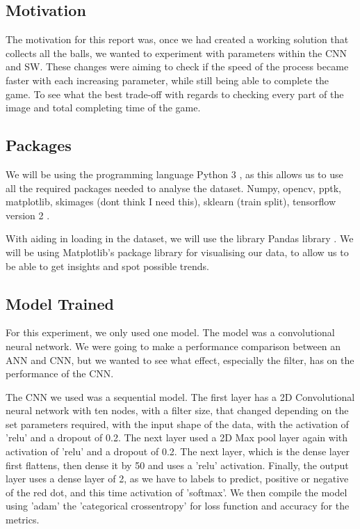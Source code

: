 \documentclass[a4paper,10pt]{article}
\begin{document}
\subsection{Motivation}

The motivation for this report was, once we had created a working solution that collects all the balls, we wanted to experiment with parameters within the CNN and SW. These changes were aiming to check if the speed of the process became faster with each increasing parameter, while still being able to complete the game. To see what the best trade-off with regards to checking every part of the image and total completing time of the game.

\subsection{Packages}
We will be using the programming language Python 3 \cite{Python}, as this allows us to use all the required packages needed to analyse the dataset. Numpy, opencv, pptk, matplotlib, skimages (dont think I need this), sklearn (train split), tensorflow version 2 \cite{tensorflow2015-whitepaper}.

With aiding in loading in the dataset, we will use the library Pandas library \cite{mckinney-proc-scipy-2010}. We will be using Matplotlib's \cite{hunter2007matplotlib} package library for visualising our data, to allow us to be able to get insights and spot possible trends.


\subsection{Model Trained}
For this experiment, we only used one model. The model was a convolutional neural network. We were going to make a performance comparison between an ANN and CNN, but we wanted to see what effect, especially the filter, has on the performance of the CNN. 

The CNN we used was a sequential model. The first layer has a 2D Convolutional neural network with ten nodes, with a filter size, that changed depending on the set parameters required, with the input shape of the data, with the activation of 'relu' and a dropout of 0.2. The next layer used a 2D Max pool layer again with activation of 'relu' and a dropout of 0.2. The next layer, which is the dense layer first flattens, then dense it by 50 and uses a 'relu' activation. Finally, the output layer uses a dense layer of 2, as we have to labels to predict, positive or negative of the red dot, and this time activation of 'softmax'. We then compile the model using 'adam' the 'categorical crossentropy' for loss function and accuracy for the metrics.
\end{document}
